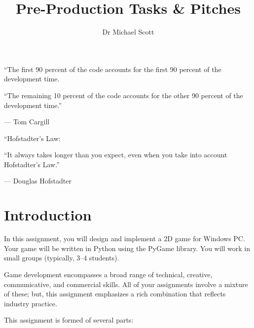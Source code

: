 \documentclass{../fal_assignment}
\title{Pre-Production Tasks \& Pitches}
\author{Dr Michael Scott}
\begin{document}
\maketitle

\begin{marginquote}
    ``The first 90 percent of the code accounts for the first 90 percent of the development time.
    
    ``The remaining 10 percent of the code accounts for the other 90 percent of the development time.''
    
    --- Tom Cargill
    
    \marginquoterule
    
    ``Hofstadter's Law:
    
    ``It always takes longer than you expect, even when you take into account Hofstadter's Law.''
    
    --- Douglas Hofstadter
\end{marginquote}

\section*{Introduction}

In this assignment, you will design and implement a 2D game for Windows PC. Your game will be written in Python using the PyGame library. You will work in small groups (typically, 3--4 students).

Game development encompasses a broad range of technical, creative, communicative, and commercial skills. All of your assignments involve a mixture of these; but, this assignment emphasizes a rich combination that reflects industry practice.

This assignment is formed of several parts:
\end{document}
